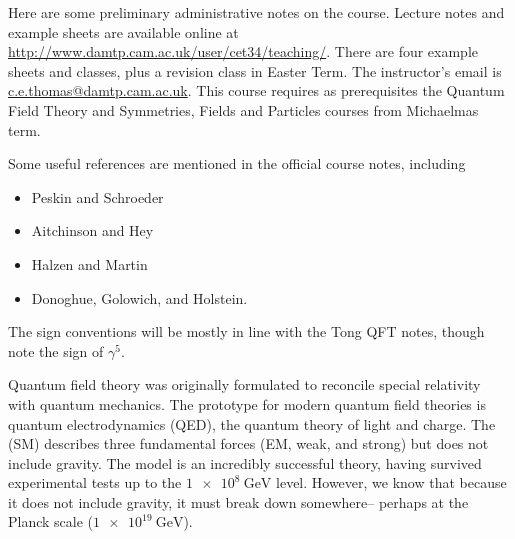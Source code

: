 \begin{note}
Here are some preliminary administrative notes on the course. Lecture notes and example sheets are available online at \url{http://www.damtp.cam.ac.uk/user/cet34/teaching/}. There are four example sheets and classes, plus a revision class in Easter Term. The instructor's email is \url{c.e.thomas@damtp.cam.ac.uk}. This course requires as prerequisites the Quantum Field Theory and Symmetries, Fields and Particles courses from Michaelmas term.

Some useful references are mentioned in the official course notes, including
\begin{itemize}
    \item Peskin and Schroeder
    \item Aitchinson and Hey
    \item Halzen and Martin
    \item Donoghue, Golowich, and Holstein.
\end{itemize}
The sign conventions will be mostly in line with the Tong QFT notes, though note the sign of $\gamma^5$.
\end{note}

Quantum field theory was originally formulated to reconcile special relativity with quantum mechanics. The prototype for modern quantum field theories is quantum electrodynamics (QED), the quantum theory of light and charge. The  (SM) describes three fundamental forces (EM, weak, and strong) but does not include gravity. The model is an incredibly successful theory, having survived experimental tests up to the $\SI{1e8}{\giga\electronvolt}$ level. However, we know that because it does not include gravity, it must break down somewhere-- perhaps at the Planck scale ($\SI{1e19}{\giga\electronvolt}$).

